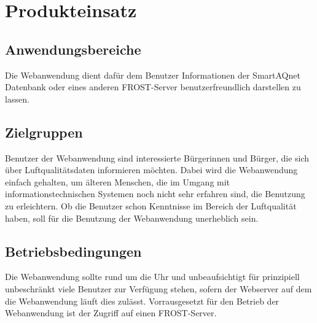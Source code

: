 \section{Produkteinsatz}

\subsection{Anwendungsbereiche}

Die \gls{Webanwendung} dient dafür dem Benutzer Informationen der \gls{SmartAQnet} Datenbank oder eines anderen \gls{FROST-Server} benutzerfreundlich darstellen zu lassen.

\subsection{Zielgruppen}

Benutzer der \gls{Webanwendung} sind interessierte Bürgerinnen und Bürger, die sich über Luftqualitätsdaten informieren möchten. 
Dabei wird die \gls{Webanwendung} einfach gehalten, um älteren Menschen, die im Umgang mit informationstechnischen Systemen noch nicht sehr erfahren sind, die Benutzung zu erleichtern.
Ob die Benutzer schon Kenntnisse im Bereich der Luftqualität haben, soll für die Benutzung der \gls{Webanwendung} unerheblich sein.

\subsection{Betriebsbedingungen}

Die \gls{Webanwendung} sollte rund um die Uhr und unbeaufsichtigt für prinzipiell unbeschränkt viele Benutzer zur Verfügung stehen, sofern der \gls{Webserver} auf dem die \gls{Webanwendung} läuft dies zulässt. 
Vorrausgesetzt für den Betrieb der \gls{Webanwendung} ist der Zugriff auf einen \gls{FROST-Server}.